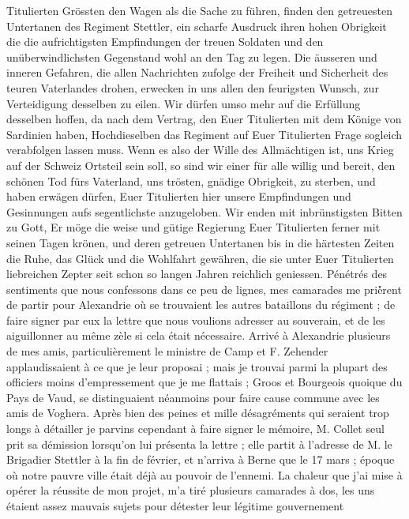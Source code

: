 \documentclass[12pt]{article}
\begin{document}
 Titulierten Grössten den Wagen als die Sache zu führen,
finden den getreuesten Untertanen des Regiment Stettler, ein scharfe Ausdruck ihren hohen Obrigkeit
die die aufrichtigsten Empfindungen der treuen Soldaten und den unüberwindlichsten Gegenstand wohl
an den Tag zu legen. Die äusseren und inneren Gefahren, die allen Nachrichten zufolge der Freiheit
und Sicherheit des teuren Vaterlandes drohen, erwecken in uns allen den feurigsten Wunsch, zur
Verteidigung desselben zu eilen. Wir dürfen umso mehr auf die Erfüllung desselben hoffen, da nach
dem Vertrag, den Euer Titulierten mit dem Könige von Sardinien haben, Hochdieselben das Regiment auf
Euer Titulierten Frage sogleich verabfolgen lassen muss. Wenn es also der Wille des Allmächtigen
ist, uns Krieg auf der Schweiz Ortsteil sein soll, so sind wir einer für alle willig und bereit, den
schönen Tod fürs Vaterland, uns trösten, gnädige Obrigkeit, zu sterben, und haben erwägen dürfen,
Euer Titulierten hier unsere Empfindungen und Gesinnungen aufs segentlichste anzugeloben. Wir enden
mit inbrünstigsten Bitten zu Gott, Er möge die weise und gütige Regierung Euer Titulierten ferner
mit seinen Tagen krönen, und deren getreuen Untertanen bis in die härtesten Zeiten die Ruhe, das
Glück und die Wohlfahrt gewähren, die sie unter Euer Titulierten liebreichen Zepter seit schon so
langen Jahren reichlich geniessen. Pénétrés des sentiments que nous confessons dans ce peu de
lignes, mes camarades me priè́rent de partir pour Alexandrie où se trouvaient les autres bataillons
du régiment ; de faire signer par eux la lettre que nous voulions adresser au souverain, et de les
aiguillonner au même zèle si cela était nécessaire. Arrivé à Alexandrie plusieurs de mes amis,
particulièrement le ministre de Camp et F. Zehender applaudissaient à ce que je leur proposai ; mais
je trouvai parmi la plupart des officiers moins d’empressement que je me flattais ; Groos et
Bourgeois quoique du Pays de Vaud, se distinguaient néanmoins pour faire cause commune avec les amis
de Voghera. Après bien des peines et mille désagréments qui seraient trop longs à détailler je
parvins cependant à faire signer le mémoire, M. Collet seul prit sa démission lorsqu’on lui présenta
la lettre ; elle partit à l’adresse de M. le Brigadier Stettler à la fin de février, et n’arriva à
Berne que le 17 mars ; époque où notre pauvre ville était déjà au pouvoir de l’ennemi. La chaleur
que j’ai mise à opérer la réussite de mon projet, m’a tiré plusieurs camarades à dos, les uns
étaient assez mauvais sujets pour détester leur légitime gouvernement
\end{document}
